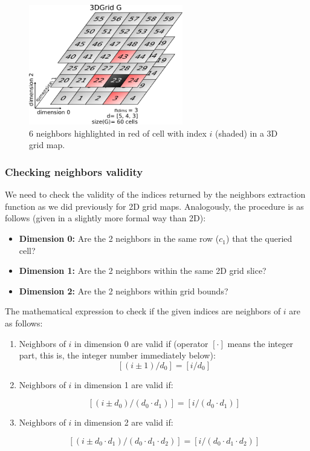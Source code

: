 \documentclass[12pt]{article}
\begin{document}
\begin{figure}[ht]
    \centering
    \includegraphics[width=0.6\textwidth]{3d_grid}
    \caption{6 neighbors highlighted in red of cell with index $i$ (shaded) in a 3D grid map.}
    \label{fig:3d_grid}
\end{figure}

\subsubsection{Checking neighbors validity}
We need to check the validity of the indices returned by the neighbors extraction function as we did previously for 2D grid maps. Analogously, the procedure is as follows (given in a slightly more formal way than 2D):

\begin{itemize}
 \item \textbf{Dimension 0:} Are the 2 neighbors in the same row ($c_1$) that the queried cell?
 \item \textbf{Dimension 1:} Are the 2 neighbors within the same 2D grid slice?
 \item \textbf{Dimension 2:} Are the 2 neighbors within grid bounds?
\end{itemize}

The mathematical expression to check if the given indices are neighbors of $i$ are as follows:

\begin{enumerate}
 \item Neighbors of $i$ in dimension 0 are valid if (operator $[\cdot]$ means the integer part, this is, the integer number immediately below):
  \begin{equation}
   \left[(i\pm1)/d_0\right] = \left[i/d_0\right]
  \end{equation}

 \item Neighbors of $i$ in dimension 1 are valid if:
 
   \begin{equation}
	\left[(i \pm d_0) / (d_0\cdot d_1)\right] = \left[i/(d_0\cdot d_1)\right] 
   \end{equation}
      
      
   \item Neighbors of $i$ in dimension 2 are valid if:
 
   \begin{equation}
	\left[(i \pm d_0\cdot d_1) / (d_0\cdot d_1\cdot d_2)\right] = \left[i/(d_0\cdot d_1\cdot d_2)\right] 
      \end{equation}
\end{enumerate}
\end{document}
